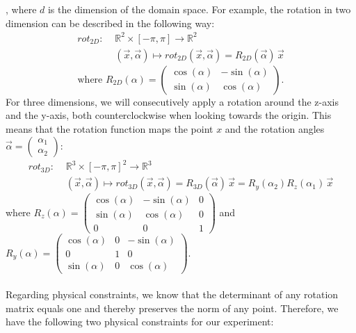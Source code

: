 , where $d$ is the dimension of the domain space. For example, the rotation in two dimension can be described in the following way:
\begin{equation}
\label{rot_fn_dim2}
\begin{aligned}
rot_{2D}: \,\,& \mathbb{R}^{2} \times [- \pi, \pi]  \to \mathbb{R}^{2}\\
&(\vec{x}, \vec{\alpha}) \mapsto rot_{2D}(\vec{x}, \vec{\alpha}) = R_{2D}(\vec{\alpha}) \,\vec{x}
\end{aligned}
\end{equation}
\[\text{where} \,\,R_{2D}(\alpha) = \begin{pmatrix} \cos(\alpha) & -\sin(\alpha) \\\sin(\alpha) & \cos(\alpha) \end{pmatrix}.\]
\indent For three dimensions, we will consecutively apply a rotation around the z-axis and the y-axis, both counterclockwise when looking towards the origin. This means that the rotation function maps the point $x$ and the rotation angles $\vec{\alpha} = \begin{pmatrix}
\alpha_1\\
\alpha_2
\end{pmatrix}$:
\begin{equation}
\label{rot_fn_dim3}
\begin{aligned}
rot_{3D}: \,\,& \mathbb{R}^{3} \times [- \pi, \pi]^2  \to \mathbb{R}^{3}\\
&(\vec{x}, \vec{\alpha}) \mapsto rot_{3D}(\vec{x}, \vec{\alpha}) = R_{3D}(\vec{\alpha})\,\vec{x} = R_{y}(\alpha_2) R_{z}(\alpha_1) \,\vec{x}
\end{aligned}
\end{equation}
where $R_{z}(\alpha) = \begin{pmatrix} \cos(\alpha) & -\sin(\alpha) & 0\\\sin(\alpha) & \cos(\alpha) & 0\\ 0 & 0 & 1\end{pmatrix}$
and $R_{y}(\alpha) = \begin{pmatrix} \cos(\alpha) & 0 & -\sin(\alpha)\\ 0 & 1 & 0\\\sin(\alpha) & 0 & \cos(\alpha)\end{pmatrix}$.\\
\\
\indent Regarding physical constraints, we know that the determinant of any rotation matrix equals one and thereby preserves the norm of any point. Therefore, we have the following two physical constraints for our experiment:

